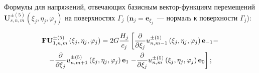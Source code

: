 %
%
%

Формулы для напряжений, отвечающих базисным вектор-функциям перемещений $\mathbf{U}_{s,n,m}^{\pm(5)}(\xi_j,\eta_j,\varphi_j)$ на поверхностях $\Gamma_j$ ($\mathbf{n}_j=\mathbf{e}_{\xi_j}$~--- нормаль к поверхности  $\Gamma_j$):

\begin{multline}
{\bf{FU}}_{1,n,m}^{ \pm (5)}\left( {{\xi _j},{\eta _j},{\varphi _j}} \right) = 2G\frac{{{H_j}}}{{{c_j}}}\left[ {\frac{\partial }{{\partial {\xi _j}}}u_{n,m - 1}^{ \pm (5)}\left( {{\xi _j},{\eta _j},{\varphi _j}} \right){{\bf{e}}_{ - 1}} - } \right.\\
- \frac{\partial }{{\partial {\xi _j}}}u_{n,m + 1}^{ \pm (5)}\left( {{\xi _j},{\eta _j},{\varphi _j}} \right){{\bf{e}}_1}\left. { - \frac{\partial }{{\partial {\xi _j}}}u_{n,m}^{ \pm (5)}\left( {{\xi _j},{\eta _j},{\varphi _j}} \right){{\bf{e}}_0}} \right];
\label{eq:9:f1}
\end{multline}

